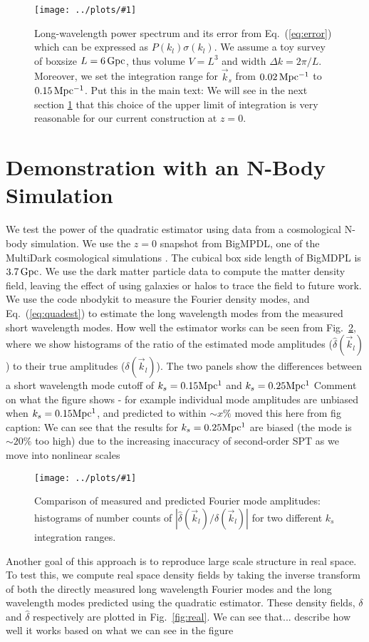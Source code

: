 \documentclass[prd,amsmath,amssymb,floatfix,superscriptaddress,nofootinbib,twocolumn]{revtex4-1}
\newcommand{\vk}{\vec{k}}
\newcommand{\ec}[1]{Eq.~(\ref{eq:#1})}
\newcommand{\rf}[1]{\ref{fig:#1}}
\newcommand{\sfig}[2]{
\texttt{[image: ../plots/\#1]}
        }
\newcommand{\Sfig}[2]{
   \begin{figure}[thbp]
   \begin{center}
    \sfig{../plots/#1.pdf}{\columnwidth}
    \caption{{\small #2}}
    \label{fig:#1}
     \end{center}
   \end{figure}
}
\newcommand{\RC}[1]{{\color{darkorange} #1}}
\begin{document}
\Sfig{SN}{Long-wavelength power spectrum and its error from \ec{error} which can be expressed as $P(k_l)\sigma(k_l)$. We assume a toy survey of boxsize $L=6\, \rm Gpc$, thus volume $V=L^3$ and width $\Delta k = 2\pi/L$. Moreover, we set the integration range for $\vk_s$ from $0.02 \, \rm Mpc^{-1}$ to $0.15\,\rm Mpc^{-1}$. \RC{Put this in the main text: We will see in the next section \ref{sec3} that this choice of the upper limit of integration is very reasonable for our current construction at $z=0$.}}

\section{Demonstration with an N-Body Simulation}\label{sec3}
We test the power of the quadratic estimator using data from a cosmological
N-body simulation. We use the $z=0$ snapshot from BigMPDL, one of the MultiDark cosmological simulations \cite{Klypin:2014nov}. The cubical box side length of BigMDPL is $3.7\,\rm Gpc$. We use the dark matter particle data to compute
the matter density field, leaving the effect of using galaxies or halos to
trace the field \cite{Desjacques:2018rev} to  future work.\\
We use the code nbodykit \cite{Hand:2018nby} 
to measure the Fourier density modes, and \ec{quadest} to estimate the
long wavelength modes  from the measured short wavelength modes. 
How well the estimator works can be seen from Fig.~\rf{hist}, where we show
histograms of the ratio of the estimated mode amplitudes ($\hat{\delta}(\vk_l)$) to their true amplitudes ($\delta(\vk_l)$). The
two panels show the differences between a short wavelength mode cutoff of $k_s=0.15 \rm Mpc^{1}$
and  $k_s=0.25 \rm Mpc^{1}$ \RC{Comment on what the figure shows - for example individual mode amplitudes are unbiased when $k_s=
  0.15 \rm Mpc^{1}$, and predicted to within $\sim x \%$} \RC{moved this
  here from fig caption:
We can see that the results for $k_s=0.25 \rm Mpc^{1}$ are
biased (the mode is $\sim 20
\%$ too high)
due to the increasing inaccuracy of second-order SPT as we move into 
nonlinear scales}
\Sfig{hist}{Comparison of measured and predicted Fourier mode amplitudes: histograms of number counts of $|\hat{\delta}(\vk_l)/\delta(\vk_l)|$ for two different $k_s$ integration ranges.}
Another goal of this approach is to reproduce large scale structure in real space. To test this, we compute real space density fields by taking the
inverse transform
of both the directly measured long wavelength Fourier modes and
the long wavelength modes
predicted using the quadratic estimator. These density fields, $\delta$ and $\hat{\delta}$ respectively are plotted in Fig.~\rf{real}. We can see that...
\RC{describe how well it works based on what we can see in the figure}
\end{document}
